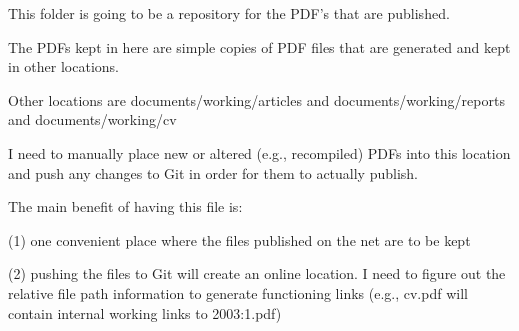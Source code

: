 This folder  is going to be a repository for the PDF's that are published.

The PDFs kept in here are simple copies of PDF files that are generated and kept in other locations.

Other locations are documents/working/articles and documents/working/reports and documents/working/cv

I need to manually place new or altered (e.g., recompiled) PDFs into this location and push any changes to Git in order for them to actually publish.

The main benefit of having this file is:

(1) one convenient place where the files published on the net are to be kept
 
(2) pushing the files to Git will create an online location.  I need to figure out the relative file path information to generate functioning links (e.g., cv.pdf will contain internal working links to 2003:1.pdf)
